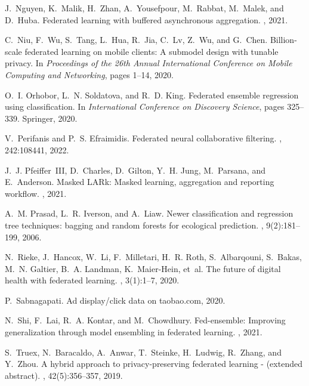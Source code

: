 \documentclass{article}
\begin{document}
\begin{thebibliography}{10}
J.~Nguyen, K.~Malik, H.~Zhan, A.~Yousefpour, M.~Rabbat, M.~Malek, and D.~Huba.
\newblock Federated learning with buffered asynchronous aggregation.
, 2021.

C.~Niu, F.~Wu, S.~Tang, L.~Hua, R.~Jia, C.~Lv, Z.~Wu, and G.~Chen.
\newblock Billion-scale federated learning on mobile clients: A submodel design
  with tunable privacy.
\newblock In {\em Proceedings of the 26th Annual International Conference on
  Mobile Computing and Networking}, pages 1--14, 2020.

O.~I. Orhobor, L.~N. Soldatova, and R.~D. King.
\newblock Federated ensemble regression using classification.
\newblock In {\em International Conference on Discovery Science}, pages
  325--339. Springer, 2020.

V.~Perifanis and P.~S. Efraimidis.
\newblock Federated neural collaborative filtering.
, 242:108441, 2022.

J.~J. Pfeiffer~III, D.~Charles, D.~Gilton, Y.~H. Jung, M.~Parsana, and
  E.~Anderson.
\newblock Masked {LARk}: Masked learning, aggregation and reporting workflow.
, 2021.

A.~M. Prasad, L.~R. Iverson, and A.~Liaw.
\newblock Newer classification and regression tree techniques: bagging and
  random forests for ecological prediction.
, 9(2):181--199, 2006.

N.~Rieke, J.~Hancox, W.~Li, F.~Milletari, H.~R. Roth, S.~Albarqouni, S.~Bakas,
  M.~N. Galtier, B.~A. Landman, K.~Maier-Hein, et~al.
\newblock The future of digital health with federated learning.
, 3(1):1--7, 2020.

P.~Sabnagapati.
\newblock Ad display/click data on taobao.com, 2020.

N.~Shi, F.~Lai, R.~A. Kontar, and M.~Chowdhury.
\newblock Fed-ensemble: Improving generalization through model ensembling in
  federated learning.
, 2021.

S.~Truex, N.~Baracaldo, A.~Anwar, T.~Steinke, H.~Ludwig, R.~Zhang, and Y.~Zhou.
\newblock A hybrid approach to privacy-preserving federated learning -
  (extended abstract).
, 42(5):356--357, 2019.


\end{thebibliography}
\end{document}
